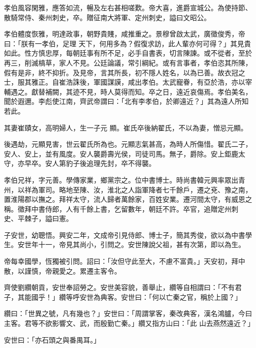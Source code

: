 \begin{pinyinscope}
 孝伯風容閑雅，應答如流，暢及左右甚相嗟歎。帝大喜，進爵宣城公。為使持節、散騎常侍、秦州刺史，卒。贈征南大將軍、定州刺史，謚曰文昭公。



 孝伯體度恢雅，明達政事，朝野貴賤，咸推重之。景穆曾啟太武，廣徵俊秀，帝曰：「朕有一孝伯，足理
 天下，何用多為？假復求訪，此人輩亦何可得？」其見貴如此。性方慎忠厚，每朝廷事有所不足，必手自書表，切言陳諫。或不從者，至於再三，削滅槁草，家人不見。公廷論議，常引綱紀。或有言事者，孝伯恣其所陳，假有是非，終不抑折。及見帝，言其所長，初不隱人姓名，以為已善。故衣冠之士，服其雅正。自崔浩誅後，軍國謀謨，咸出孝伯。太武寵眷，有亞於浩，亦以宰輔遇之。獻替補闕，其迹不見，時人莫得而知。卒之日，遠近哀傷焉。孝伯美名，聞於遐邇。李彪使江南，齊武帝謂曰：「北有李孝伯，於卿遠近？」其為遠人所知若此。



 其妻崔賾女，高明婦人，生一子元
 顯。崔氏卒後納翟氏，不以為妻，憎忌元顯。



 後遇劫，元顯見害，世云翟氏所為也。元顯志氣甚高，為時人所傷惜。翟氏二子，安人、安上，並有風度。安人襲爵壽光侯，司徒司馬。無子，爵除。安上鉅鹿太守，亦早卒。安人第豹子後追理先封，卒不得襲。



 孝伯兄祥，字元善。學傳家業，鄉黨宗之。位中書博士。時尚書韓元興率眾出青州，以祥為軍司。略地至陳、汝，淮北之人詣軍降者七千餘戶，遷之兗、豫之南，置淮陽郡以撫之。拜祥太守，流人歸者萬餘家，百姓安業。遷河間太守，有威恩之稱。徵拜中書侍郎，人有千餘上書，乞留數年，朝廷不許。卒官，追贈定州刺
 史、平棘子，謚曰憲。



 子安世，幼聰悟。興安二年，文成帝引見侍郎、博士子，簡其秀俊，欲以為中書學生。安世年十一，帝見其尚小，引問之。安世陳說父祖，甚有次第，即以為生。



 帝每幸國學，恆獨被引問。詔曰：「汝但守此至大，不慮不富貴。」天安初，拜中散，以謹慎，帝親愛之。累遷主客令。



 齊使劉纘朝貢，安世奉詔勞之。安世美容貌，善舉止，纘等自相謂曰：「不有君子，其能國乎！」纘等呼安世為典客。安世曰：「何以亡秦之官，稱於上國？」



 纘曰：「世異之號，凡有幾也？」安世曰：「周謂掌客，秦改典客，漢名鴻臚，今曰主客。君等不欲影響文、武，而殷勤亡秦。」纘又指方山曰：「此
 山去燕然遠近？」



 安世曰：「亦石頭之與番禺耳。」




\end{pinyinscope}
